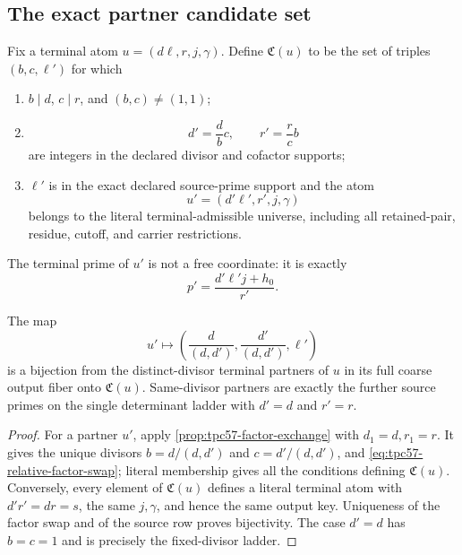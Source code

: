 \subsection{The exact partner candidate set}

Fix a terminal atom \(u=(d\ell,r,j,\gamma)\).  Define
\(\mathfrak C(u)\) to be the set of triples \((b,c,\ell')\) for which
\begin{enumerate}[label=\textup{(\roman*)},leftmargin=3em]
 \item \(b\mid d\), \(c\mid r\), and
       \((b,c)\ne(1,1)\);
 \item
       \[
        d'=\frac d b c,
        \qquad r'=\frac r c b
       \]
       are integers in the declared divisor and cofactor supports;
 \item \(\ell'\) is in the exact declared source-prime support and the
       atom
       \[
        u'=\left(d'\ell',r',j,\gamma\right)
       \]
       belongs to the literal terminal-admissible universe, including all
       retained-pair, residue, cutoff, and carrier restrictions.
\end{enumerate}
The terminal prime of \(u'\) is not a free coordinate: it is exactly
\begin{equation}
 p'=\frac{d'\ell'j+h_0}{r'}.
 \label{eq:tpc57-partner-prime}
\end{equation}

\begin{proposition}
\label{prop:tpc57-exact-partner-set}
The map
\begin{equation}
 u'\longmapsto
 \left(\frac d{(d,d')},
       \frac{d'}{(d,d')},\ell'\right)
 \label{eq:tpc57-partner-map}
\end{equation}
is a bijection from the distinct-divisor terminal partners of \(u\) in
its full coarse output fiber onto \(\mathfrak C(u)\).  Same-divisor
partners are exactly the further source primes on the single determinant
ladder with \(d'=d\) and \(r'=r\).
\end{proposition}

\begin{proof}
For a partner \(u'\), apply
\cref{prop:tpc57-factor-exchange} with \(d_1=d,r_1=r\).  It gives the
unique divisors \(b=d/(d,d')\) and \(c=d'/(d,d')\), and
\eqref{eq:tpc57-relative-factor-swap}; literal membership gives all the
conditions defining \(\mathfrak C(u)\).  Conversely, every element of
\(\mathfrak C(u)\) defines a literal terminal atom with
\(d'r'=dr=s\), the same \(j,\gamma\), and hence the same output key.
Uniqueness of the factor swap and of the source row proves bijectivity.
The case \(d'=d\) has \(b=c=1\) and is precisely the fixed-divisor
ladder.
\end{proof}

